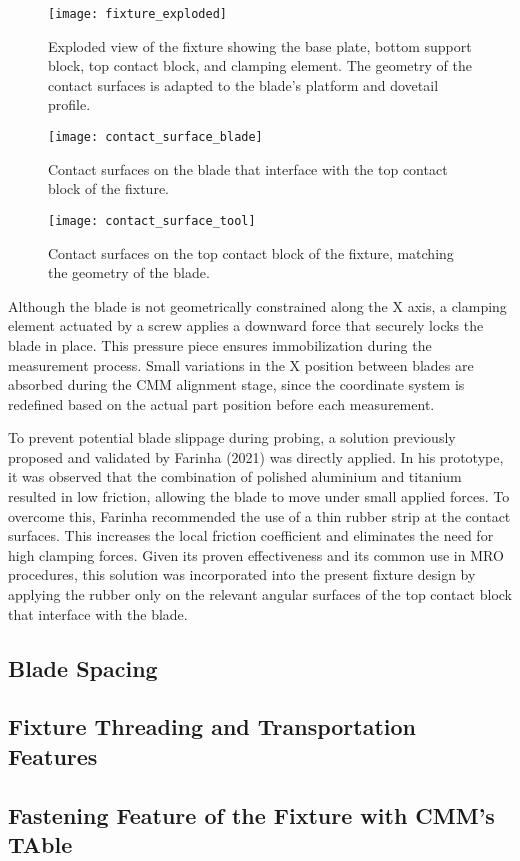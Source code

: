 \begin{figure}[H]
    \centering
    \texttt{[image: fixture\_exploded]}
    \caption{Exploded view of the fixture showing the base plate, bottom support block, top contact block, and clamping element. The geometry of the contact surfaces is adapted to the blade’s platform and dovetail profile.}
    \label{fig:fixture_exploded}
\end{figure}

\begin{figure}[H]
    \centering
    \texttt{[image: contact\_surface\_blade]}
    \caption{Contact surfaces on the blade that interface with the top contact block of the fixture.}
    \label{fig:contact_surface_blade}
\end{figure}

\begin{figure}[H]
    \centering
    \texttt{[image: contact\_surface\_tool]}
    \caption{Contact surfaces on the top contact block of the fixture, matching the geometry of the blade.}
    \label{fig:contact_surface_tool}
\end{figure}

Although the blade is not geometrically constrained along the X axis, a clamping element actuated by a screw applies a downward force that securely locks the blade in place. 
This pressure piece ensures immobilization during the measurement process. 
Small variations in the X position between blades are absorbed during the CMM alignment stage, since the coordinate system is redefined based on the actual part position before each measurement.

To prevent potential blade slippage during probing, a solution previously proposed and validated by Farinha (2021) was directly applied. 
In his prototype, it was observed that the combination of polished aluminium and titanium resulted in low friction, allowing the blade to move under small applied forces. 
To overcome this, Farinha recommended the use of a thin rubber strip at the contact surfaces. This increases the local friction coefficient and eliminates the need for high clamping forces. 
Given its proven effectiveness and its common use in MRO procedures, this solution was incorporated into the present fixture design by applying the rubber only on the relevant angular surfaces of the top contact block that interface with the blade.

\subsection{Blade Spacing }




\subsection{Fixture Threading and Transportation Features}

\subsection{Fastening Feature of the Fixture with CMM's TAble}
